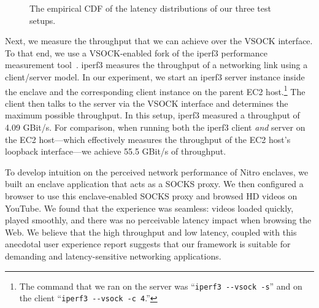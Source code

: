 \begin{figure}[t]
    \centering
    
    \label{fig:latency-cdf}
    \caption{The empirical CDF of the latency distributions of our three test setups.}
\end{figure}

Next, we measure the throughput that we can achieve over the VSOCK interface.
To that end, we use a VSOCK-enabled fork of the iperf3 performance measurement
tool~\cite{iperf-vsock}.  iperf3 measures the throughput of a networking link
using a client/server model.  In our experiment, we start an iperf3 server
instance inside the enclave and the corresponding client instance on the parent
EC2 host.\footnote{The command that we ran on the server was
``\texttt{iperf3 -{}-vsock -s}'' and on the client ``\texttt{iperf3 -{}-vsock -c
4}.''} The client then talks to the server via the VSOCK interface and
determines the maximum possible throughput.  In this setup, iperf3 measured a
throughput of 4.09 GBit/s.  For comparison, when running both the iperf3 client
\emph{and} server on the EC2 host---which effectively measures the
throughput of the EC2 host's loopback interface---we achieve 55.5 GBit/s of
throughput.

To develop intuition on the perceived network performance of Nitro enclaves, we
built an enclave application that acts as a SOCKS proxy.  We then configured a
browser to use this enclave-enabled SOCKS proxy and browsed HD videos on
YouTube.  We found that the experience was seamless: videos loaded quickly,
played smoothly, and there was no perceivable latency impact when browsing the
Web.  We believe that the high throughput and low latency, coupled with this
anecdotal user experience report suggests that our framework is suitable for
demanding and latency-sensitive networking applications.

%
%
%
%
%
%
